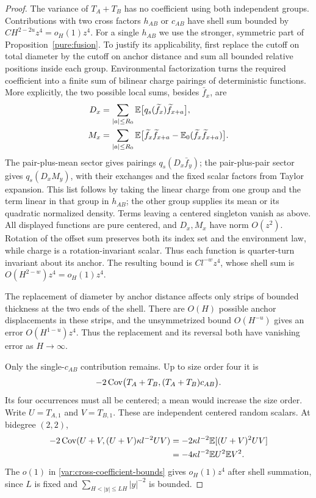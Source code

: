\begin{proof}
The variance of $T_A+T_B$ has no coefficient using both independent
groups.  Contributions with two cross factors $h_{AB}$ or $c_{AB}$
have shell sum bounded by $C H^{2-2u}z^4=o_H(1)z^4$.  For a single
$h_{AB}$ we use the stronger, symmetric part of
Proposition~\ref{pure:fusion}.  To justify its applicability, first
replace the cutoff on total diameter by the cutoff on anchor distance
and sum all bounded relative positions inside each group.  Environmental
factorization turns the required coefficient into a finite sum of
bilinear charge pairings of deterministic functions.  More explicitly,
the two possible local sums, besides $\bar f_x$, are
\begin{align*}
 D_x&=\sum_{|a|\le R_0}
       \mathbb E\bigl[q_s(\widetilde f_x)\widetilde f_{x+a}\bigr],\\
 M_x&=\sum_{|a|\le R_0}
       \mathbb E\bigl[\widetilde f_x\widetilde f_{x+a}
                   -\mathbb E_0(\widetilde f_x\widetilde f_{x+a})\bigr].
\end{align*}
The pair-plus-mean sector gives pairings $q_s(D_x\bar f_y)$;
the pair-plus-pair sector gives $q_s(D_xM_y)$, with their exchanges
and the fixed scalar factors from Taylor expansion.  This list follows
by taking the linear charge from one group and the term linear in that
group in $h_{AB}$; the other group supplies its mean or its quadratic
normalized density.  Terms leaving a centered singleton vanish as
above.  All displayed functions are pure centered, and $D_x,M_x$
have norm $O(z^2)$.  Rotation of the offset sum preserves both its
index set and the environment law, while charge is a rotation-invariant
scalar.  Thus each function is quarter-turn invariant about its anchor.
The resulting bound is
$C l^{-w}z^4$, whose shell sum is $O(H^{2-w})z^4=o_H(1)z^4$.

The replacement of diameter by anchor distance affects only strips
of bounded thickness at the two ends of the shell.  There are $O(H)$
possible anchor displacements in these strips, and the unsymmetrized
bound $O(H^{-u})$ gives an error $O(H^{1-u})z^4$.  Thus the replacement
and its reversal both have vanishing error as $H\to\infty$.

Only the single-$c_{AB}$ contribution remains.  Up to size order four
it is
\begin{equation}
 -2\operatorname{Cov}\bigl(T_A+T_B,(T_A+T_B)c_{AB}\bigr).
 \label{var:normalization-term}
\end{equation}
Its four occurrences must all be centered; a mean would increase
the size order.  Write $U=T_{A,1}$ and $V=T_{B,1}$.  These are
independent centered random scalars.  At bidegree $(2,2)$,
\begin{align}
 -2\operatorname{Cov}(U+V,(U+V)\kappa l^{-2}UV)
 &=-2\kappa l^{-2}\mathbb E[(U+V)^2UV]\notag\\
 &=-4\kappa l^{-2}\mathbb E U^2\mathbb E V^2.
 \label{var:quartic-sign}
\end{align}
The $o(1)$ in \eqref{var:cross-coefficient-bounds} gives
$o_H(1)z^4$ after shell summation, since $L$ is fixed and
$\sum_{H<|y|\le LH}|y|^{-2}$ is bounded.


\end{proof}

